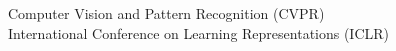 



\begin{small} \color{black}
Computer Vision and Pattern Recognition (CVPR) \\
International Conference on Learning Representations (ICLR) \\
\end{small}
